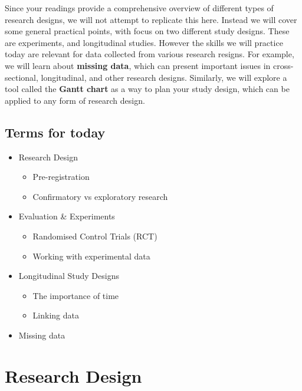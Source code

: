 \documentclass[
]{book}
\providecommand{\tightlist}{%
  \setlength{\itemsep}{0pt}\setlength{\parskip}{0pt}}
\begin{document}
Since your readings provide a comprehensive overview of different types of research designs, we will not attempt to replicate this here. Instead we will cover some general practical points, with focus on two different study designs. These are experiments, and longitudinal studies. However the skills we will practice today are relevant for data collected from various research resigns. For example, we will learn about \textbf{missing data}, which can present important issues in cross-sectional, longitudinal, and other research designs. Similarly, we will explore a tool called the \textbf{Gantt chart} as a way to plan your study design, which can be applied to any form of research design.

\hypertarget{terms-for-today-3}{%
\subsection{Terms for today}\label{terms-for-today-3}}

\begin{itemize}
\tightlist
\item
  Research Design

  \begin{itemize}
  \tightlist
  \item
    Pre-registration
  \item
    Confirmatory vs exploratory research
  \end{itemize}
\item
  Evaluation \& Experiments

  \begin{itemize}
  \tightlist
  \item
    Randomised Control Trials (RCT)
  \item
    Working with experimental data
  \end{itemize}
\item
  Longitudinal Study Designs

  \begin{itemize}
  \tightlist
  \item
    The importance of time
  \item
    Linking data
  \end{itemize}
\item
  Missing data
\end{itemize}

\hypertarget{research-design}{%
\section{Research Design}\label{research-design}}
\end{document}
